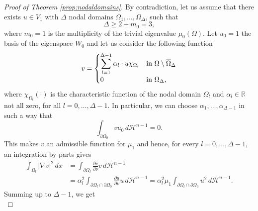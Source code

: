 \documentclass[12pt,reqno]{amsart}
\numberwithin{equation}{section}
\numberwithin{theorem}{section}
\numberwithin{equation}{section}
\numberwithin{theorem}{section}
\begin{document}
\begin{proof} [Proof of Theorem \ref{prop:nodaldomains}]



    By contradiction, let us assume that there exists $ u \in V_{1}$ with $\Delta$ nodal domains $\Omega_1,\dots,\Omega_\Delta$, such that
    \begin{equation*}
        \Delta \ge 2+m_0=3,
    \end{equation*}
    where $m_0=1$ is the multiplicity of the trivial eigenvalue $\mu_0(\Omega)$.
    Let $u_0=1$ the basis of the eigenspace $W_0$ and let us consider the following function
    \begin{equation*}
        v = 
        \begin{cases}
            \displaystyle \sum_{l=1}^{\Delta -1}\alpha_l \cdot u \chi_{\Omega_l} & \text{in} \,\, \Omega\setminus \overline{\Omega}_\Delta\\
            \displaystyle 0 & $\text{in}$\,\, \Omega_\Delta,
        \end{cases}
    \end{equation*}
    where $\chi_{\Omega_l}(\cdot)$ is the characteristic function of the nodal domain $\Omega_l$ and $\alpha_l \in \mathbb{R}$ not all zero, for all $l=0,\dots, \Delta-1$. In particular, we can choose $\alpha_1,\dots,\alpha_{\Delta-1}$ in such a way that
    \begin{equation*}
        \int_{\partial \Omega_0} v u_0\,d\mathcal{H}^{n-1}=0.
    \end{equation*}
     This makes $v$ an admissible function for $\mu_1$ and hence, for every $l=0,\dots, \Delta -1$, an integration by parts gives
    \begin{equation*}
    \begin{split}
        \int_{\Omega_l} |\nabla v|^2\,dx &= \int_{\partial \Omega_l} \frac{\partial v}{\partial \nu}v \,d\mathcal{H}^{n-1}\\
        &=\alpha_l^2 \int_{\partial \Omega_l\cap \partial \Omega_0} \frac{\partial u}{\partial \nu}u \,d\mathcal{H}^{n-1} = \alpha_l^2 \mu_1  \int_{\partial \Omega_l\cap \partial \Omega_0} u^2 \,d\mathcal{H}^{n-1}.
    \end{split}
    \end{equation*}
    Summing up to $\Delta -1$, we get
    \begin{equation*}

\end{equation*}
\end{proof}
\end{document}
